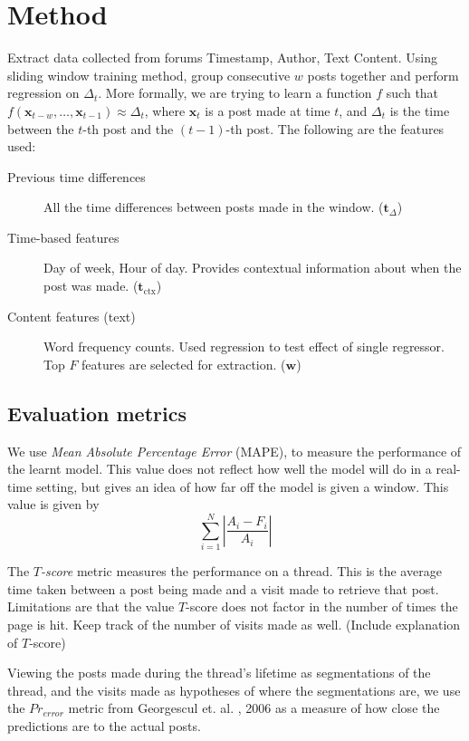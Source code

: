 \documentclass[12 pt]{article}
\begin{document}
\section{Method}

Extract data collected from forums Timestamp, Author, Text Content. Using sliding window training method, group consecutive $w$ posts together and perform regression on $\Delta_t$. More formally, we are trying to learn a function $f$ such that $f(\mathbf{x}_{t-w},\hdots, \mathbf{x}_{t-1}) \approx \Delta_{t}$, where $\mathbf{x}_t$ is a post made at time $t$, and $\Delta_t$ is the time between the $t$-th post and the $(t-1)$-th post. The following are the features used:
\begin{description}
	\item[Previous time differences] All the time differences between posts made in the window. ($\mathbf{t}_\Delta$)
	\item[Time-based features] Day of week, Hour of day. Provides contextual information about when the post was made. ($\mathbf{t}_{\text{ctx}}$)
	
	\item[Content features (text)] Word frequency counts. Used regression to test effect of single regressor. Top $F$ features are selected for extraction. ($\mathbf{w}$)

\end{description}

\subsection{Evaluation metrics}
We use \emph{Mean Absolute Percentage Error} (MAPE), to measure the performance of the learnt model. This value does not reflect how well the model will do in a real-time setting, but gives an idea of how far off the model is given a window. This value is given by
\[
	\sum^N_{i=1}\left|\frac{A_i-F_i}{A_i}\right|
\]

The \emph{$T$-score} metric measures the performance on a thread. This is the average time taken between a post being made and a visit made to retrieve that post. Limitations are that the value $T$-score does not factor in the number of times the page is hit. Keep track of the number of visits made as well. (Include explanation of $T$-score)

Viewing the posts made during the thread's lifetime as segmentations of the thread, and the visits made as hypotheses of where the segmentations are, we use the $Pr_{error}$ metric from Georgescul et. al. , 2006 as a measure of how close the predictions are to the actual posts.
\end{document}
